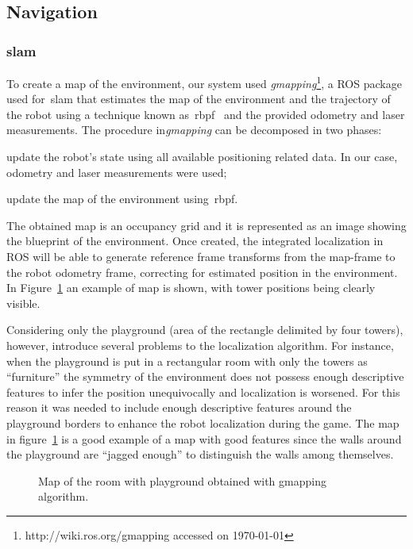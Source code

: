 \subsection{Navigation}\label{sec:navigation}
\subsubsection{\glsdesc{slam}}\label{gmapping}
To create a map of the environment, our system used \textit{gmapping}\footnote{http://wiki.ros.org/gmapping accessed on \today}, a ROS package used for~\gls{slam} that estimates the map of the environment and the trajectory of the robot using a technique known as~\gls{rbpf}~\citep{grisettiyz_improving_2005} and the provided odometry and laser measurements. The procedure in\textit{gmapping} can be decomposed in two phases: \begin{inparaenum}\item update the robot's state using all available positioning related data. In our case, odometry and laser measurements were used; \item update the map of the environment using~\gls{rbpf}.\end{inparaenum}

The obtained map is an occupancy grid and it is represented as an image showing the blueprint of the environment. Once created, the integrated localization in ROS will be able to generate reference frame transforms from the map-frame to the robot odometry frame, correcting for estimated position in the environment. In Figure~\ref{fig:playground_map} an example of map is shown, with tower positions being clearly visible.

Considering only the playground (area of the rectangle delimited by four towers), however, introduce several problems to the localization algorithm. For instance, when the playground is put in a rectangular room with only the towers as ``furniture'' the symmetry of the environment does not possess enough descriptive features to infer the position unequivocally and localization is worsened. For this reason it was needed to include enough descriptive features around the playground borders to enhance the robot localization during the game. The map in figure~\ref{fig:playground_map} is a good example of a map with good features since the walls around the playground are ``jagged enough'' to distinguish the walls among themselves. 

\begin{figure}[h]
	\centering
	\caption{Map of the room with playground obtained with gmapping algorithm.} 
	\label{fig:playground_map}
\end{figure}

